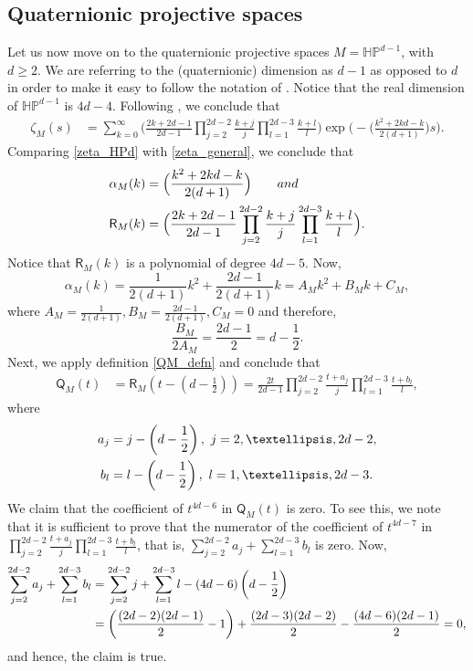 \documentclass[11pt,lettersize,reqno,fullpage]{amsart}
\begin{document}
\subsection{Quaternionic projective spaces}
Let us now move on to the quaternionic projective spaces $M=\mathbb{HP}^{d-1}$, 
with $d \geq 2$. 
We are referring to the (quaternionic) dimension as $d-1$ as opposed to $d$ in order to make it easy to follow the 
notation of \cite{Cahn}. 
Notice that the real dimension of 
$\mathbb{HP}^{d-1}$
is $4d-4$. 
Following \cite[page 10, theorem 5.2]{Cahn}, we conclude that 
\begin{align}
\zeta_{M}(s) & = \sum_{k=0}^{\infty} \Big(\frac{2k+2d-1}{2d-1}\prod_{j=2}^{2d-2} \frac{k+j}{j} 
\prod_{l=1}^{2d-3} \frac{k+l}{l}  \Big)
\exp\Big(-\Big(\frac{k^2+2kd-k}{2(d+1)}\Big)s\Big). \label{zeta_HPd}
\end{align}
Comparing \eqref{zeta_HPd} with \eqref{zeta_general}, we conclude that 
\begin{align}
\alpha_{M}(k)& = \Big(\frac{k^2+2kd-k}{2(d+1)}\Big) \qquad \textnormal{and} \nonumber \\ 
\mathsf{R}_{M}(k) & = 
\Big(\frac{2k+2d-1}{2d-1}\prod_{j=2}^{2d-2} \frac{k+j}{j} 
\prod_{l=1}^{2d-3} \frac{k+l}{l}  \Big). \nonumber 
\end{align}
Notice that $\mathsf{R}_{M}(k)$ is a polynomial of degree $4d-5$. Now, 
\[\alpha_{M}(k)=\frac{1}{2(d+1)}k^{2}+\frac{2d-1}{2(d+1)}k=A_{M}k^{2}+B_{M}k+C_{M}, \]
where $A_{M}=\frac{1}{2(d+1)}, B_{M}=\frac{2d-1}{2(d+1)}, C_{M}=0 $ and therefore, 
\[\frac{B_{M}}{2 A_{M}}=\frac{2d-1}{2}=d-\frac{1}{2}. \] 
Next, we apply definition \eqref{QM_defn} and conclude that 
\begin{align}
\mathsf{Q}_{M}(t) & = \mathsf{R}_{M}\left(t-\left(d-\frac{1}{2} \right)\right)=\frac{2t}{2d-1} \prod_{j=2}^{2d-2} \frac{t+a_{j}}{j} \prod_{l=1}^{2d-3} \frac{t+b_{l}}{l},
\end{align}
where 
\begin{equation}
\begin{aligned}
a_{j}&= j-\left(d-\frac{1}{2} \right), \ j=2,\dots,2d-2, \\
b_{l}&= l-\left(d-\frac{1}{2} \right), \ l=1,\dots,2d-3.
\end{aligned}
\notag
\end{equation}
We claim that the coefficient of $t^{4d-6} $ in $\mathsf{Q}_{M}(t)$ is zero. To see this, we note that it is sufficient to prove that the numerator of the coefficient of $t^{4d-7} $ in $  \prod_{j=2}^{2d-2} \frac{t+a_{j}}{j} \prod_{l=1}^{2d-3} \frac{t+b_{l}}{l} $, that is, $\sum_{j=2}^{2d-2} a_{j}+\sum_{l=1}^{2d-3} b_{l} $ is zero. Now,
\begin{equation}
\begin{aligned}
\sum_{j=2}^{2d-2} a_{j}+\sum_{l=1}^{2d-3} b_{l}&=\sum_{j=2}^{2d-2} j+\sum_{l=1}^{2d-3} l-(4d-6)\left(d-\frac{1}{2} \right)\\
&=\left(\frac{(2d-2)(2d-1)}{2}-1\right)+\frac{(2d-3)(2d-2)}{2}-\frac{(4d-6)(2d-1)}{2}=0,
\end{aligned}
\notag
\end{equation}
and hence, the claim is true.
%
\end{document}
